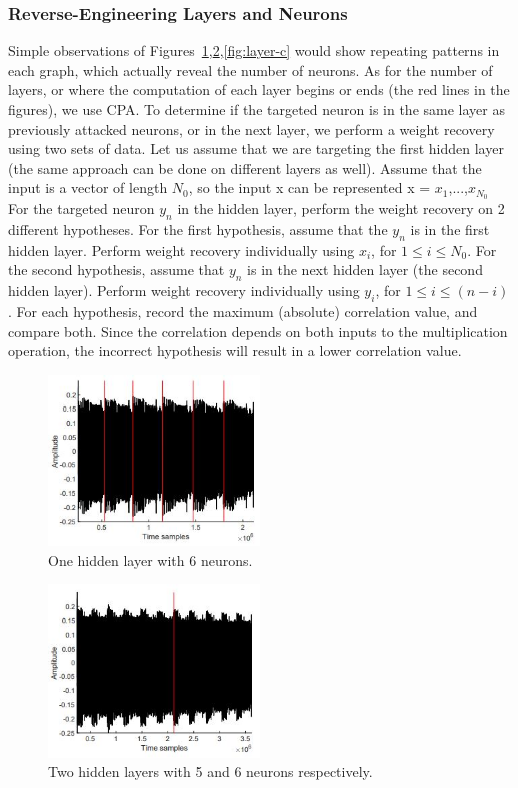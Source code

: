\subsubsection{Reverse-Engineering Layers and Neurons}
Simple observations of Figures~\ref{fig:layer-a},\ref{fig:layer-b},\ref{fig:layer-c} would show repeating patterns in each graph, which actually reveal the number of neurons.
As for the number of layers, or where the computation of each layer begins or ends (the red lines in the figures), we use CPA.
To determine if the targeted neuron is in the same layer as
previously attacked neurons, or in the next layer, we perform a weight recovery using two sets of data.
Let us assume that we are targeting the first hidden layer (the same approach can be done on different layers as well).
Assume that the input is a vector of length \(N_0\), so the input x can be represented x = \(x_1\),...,\(x_{N_0}\)
For the targeted neuron \(y_n\) in the hidden layer, perform the weight recovery on 2 different hypotheses.
For the first hypothesis, assume that the \(y_n\) is in the first hidden layer. Perform weight recovery individually using
\(x_i\), for \( 1\leq i \leq N_0\).
For the second hypothesis, assume that \(y_n\) is in the next
hidden layer (the second hidden layer).
Perform weight recovery individually using \(y_i\), for \(1\leq i \leq (n − i)\). For each hypothesis, record the maximum (absolute) correlation value, and compare both. Since the correlation depends on both inputs to the
multiplication operation, the incorrect hypothesis will result in a lower correlation value.

\begin{figure}
    \centering
    \includegraphics[width=0.5\textwidth]{images/chapter8/layer-a.JPG}
    \caption{One hidden layer with 6 neurons.}
    \label{fig:layer-a}
\end{figure}

\begin{figure}
    \centering
    \includegraphics[width=0.5\textwidth]{images/chapter8/layer-b.JPG}
    \caption{Two hidden layers with 5 and 6 neurons respectively.}
    \label{fig:layer-b}
\end{figure}

